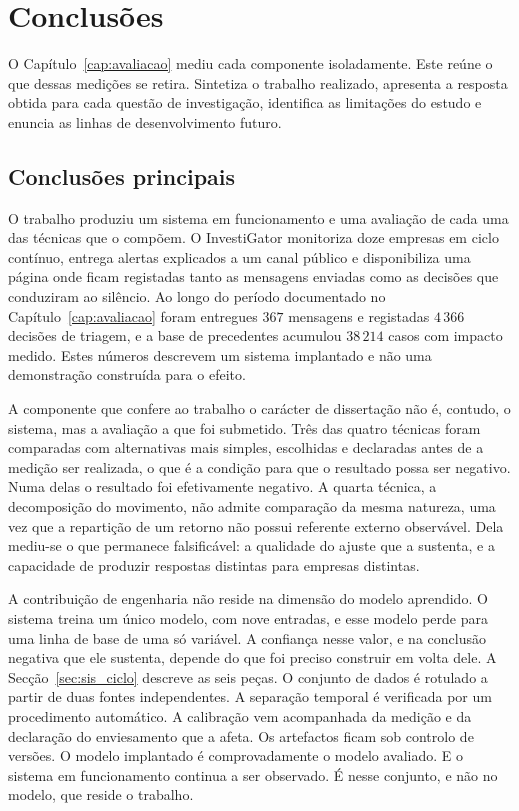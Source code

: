 \chapter{Conclusões}
\label{cap:conclusoes}

O Capítulo~\ref{cap:avaliacao} mediu cada componente isoladamente. Este reúne o que dessas
medições se retira. Sintetiza o trabalho realizado, apresenta a resposta obtida para cada questão de
investigação, identifica as limitações do estudo e enuncia as linhas de desenvolvimento futuro.

\section{Conclusões principais}
\label{sec:con_principais}

O trabalho produziu um sistema em funcionamento e uma avaliação de cada uma das técnicas que o
compõem. O InvestiGator monitoriza doze empresas em ciclo contínuo, entrega alertas explicados a um
canal público e disponibiliza uma página onde ficam registadas tanto as mensagens enviadas como as
decisões que conduziram ao silêncio. Ao longo do período documentado no
Capítulo~\ref{cap:avaliacao} foram entregues $367$ mensagens e registadas $4\,366$ decisões de
triagem, e a base de precedentes acumulou $38\,214$ casos com impacto medido. Estes números
descrevem um sistema implantado e não uma demonstração construída para o efeito.

A componente que confere ao trabalho o carácter de dissertação não é, contudo, o sistema, mas a
avaliação a que foi submetido. Três das quatro técnicas foram comparadas com alternativas mais
simples, escolhidas e declaradas antes de a medição ser realizada, o que é a condição para que o
resultado possa ser negativo. Numa delas o resultado foi efetivamente negativo. A quarta técnica, a decomposição do movimento, não admite comparação da mesma natureza, uma vez
que a repartição de um retorno não possui referente externo observável. Dela mediu-se o que
permanece falsificável: a qualidade do ajuste que a sustenta, e a capacidade de produzir respostas
distintas para empresas distintas.

A contribuição de engenharia não reside na dimensão do modelo aprendido. O sistema treina um único
modelo, com nove entradas, e esse modelo perde para uma linha de base de uma só variável. A confiança nesse valor, e na conclusão negativa que ele sustenta, depende do que foi preciso
construir em volta dele. A Secção~\ref{sec:sis_ciclo} descreve as seis peças. O conjunto de dados
é rotulado a partir de duas fontes independentes. A separação temporal é verificada por um
procedimento automático. A calibração vem acompanhada da medição e da declaração do enviesamento
que a afeta. Os artefactos ficam sob controlo de versões. O modelo implantado é comprovadamente o
modelo avaliado. E o sistema em funcionamento continua a ser observado. É nesse conjunto, e não no
modelo, que reside o trabalho.

